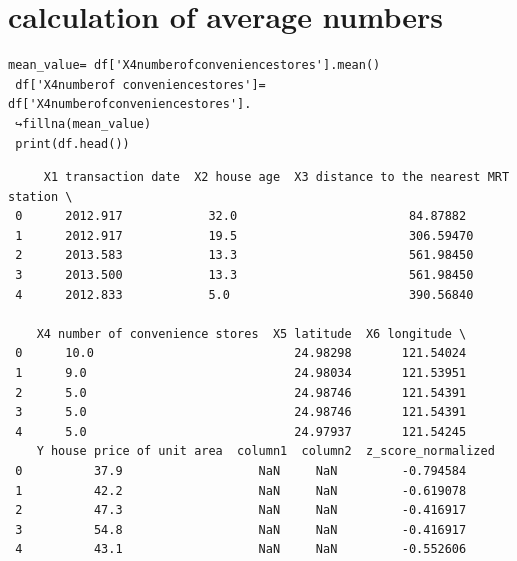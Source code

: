 \section{calculation of average numbers}
\begin{lstlisting}
mean_value= df['X4numberofconveniencestores'].mean()
 df['X4numberof conveniencestores']= df['X4numberofconveniencestores'].
 ↪fillna(mean_value)
 print(df.head())
\end{lstlisting}
\begin{verbatim}
     X1 transaction date  X2 house age  X3 distance to the nearest MRT station \
 0      2012.917            32.0                        84.87882
 1      2012.917            19.5                        306.59470
 2      2013.583            13.3                        561.98450
 3      2013.500            13.3                        561.98450
 4      2012.833            5.0                         390.56840
 
    X4 number of convenience stores  X5 latitude  X6 longitude \
 0      10.0                            24.98298       121.54024
 1      9.0                             24.98034       121.53951
 2      5.0                             24.98746       121.54391
 3      5.0                             24.98746       121.54391
 4      5.0                             24.97937       121.54245
    Y house price of unit area  column1  column2  z_score_normalized
 0          37.9                   NaN     NaN         -0.794584
 1          42.2                   NaN     NaN         -0.619078
 2          47.3                   NaN     NaN         -0.416917
 3          54.8                   NaN     NaN         -0.416917
 4          43.1                   NaN     NaN         -0.552606          
\end{verbatim}
